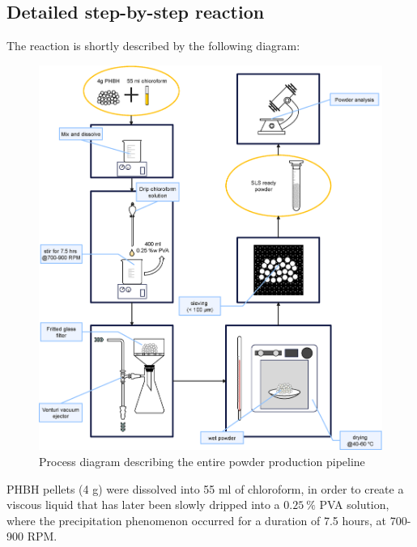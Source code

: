 \documentclass[a4paper]{article}
\begin{document}
        \subsection{Detailed step-by-step reaction\label{detailed_reaction}}

        The reaction is shortly described by the following diagram: 

            \begin{figure}[ht]
                \centering
                \includegraphics[width=\textwidth]{Pictures/process_diagram.eps}
                \caption{Process diagram describing the entire powder production pipeline}
                \label{fig:process_diagram}
            \end{figure}

        \clearpage

        PHBH pellets (4 g) were dissolved into 55 ml of chloroform, in order to create a viscous liquid that has later been slowly dripped into a 
        $0.25 \ \%$ PVA solution, where the precipitation phenomenon occurred for a duration of 7.5 hours, at 700-900 RPM. \\ 

        
\end{document}

